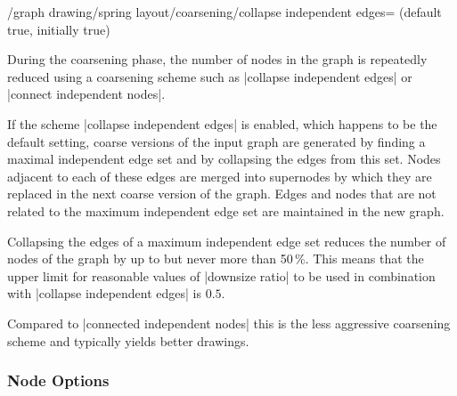 \begin{key}{/graph drawing/spring layout/coarsening/collapse independent
  edges= (default true, initially true)}

  During the coarsening phase, the number of nodes in the graph is
  repeatedly reduced using a coarsening scheme such as 
  |collapse independent edges| or |connect independent nodes|.

  If the scheme |collapse independent edges| is enabled, which happens
  to be the default setting, coarse versions of the input graph are 
  generated by finding a maximal independent edge set and by collapsing
  the edges from this set. Nodes adjacent to each of these edges are
  merged into supernodes by which they are replaced in the next coarse
  version of the graph. Edges and nodes that are not related to the
  maximum independent edge set are maintained in the new graph.

  Collapsing the edges of a maximum independent edge set reduces the
  number of nodes of the graph by up to but never more than 50\,\%. 
  This means that the upper limit for reasonable values of 
  |downsize ratio| to be used in combination with 
  |collapse independent edges| is $0.5$. 
  
  Compared to |connected independent nodes| this is the less aggressive
  coarsening scheme and typically yields better drawings.
\end{key}


\subsubsection{Node Options}

%

